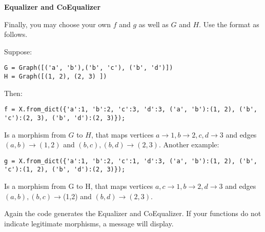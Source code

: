 \documentclass{ximera}
\begin{document}
\textbf{Equalizer and CoEqualizer}

Finally, you may choose your own $f$ and $g$ as well as $G$ and $H$.  Use the format as follows.

Suppose:

\begin{verbatim}
G = Graph([('a', 'b'),('b', 'c'), ('b', 'd')])
H = Graph([(1, 2), (2, 3) ])
\end{verbatim}

Then:

\begin{verbatim}
f = X.from_dict({'a':1, 'b':2, 'c':3, 'd':3, ('a', 'b'):(1, 2), ('b', 'c'):(2, 3), ('b', 'd'):(2, 3)}); 
\end{verbatim}

Is a morphism from $G$ to $H$, that maps vertices $a\to1, b\to2, c,d\to3$ and edges $(a,b)\to(1,2)$ and $(b,c), (b,d)\to(2,3)$.  Another example:

\begin{verbatim}
g = X.from_dict({'a':1, 'b':2, 'c':1, 'd':3, ('a', 'b'):(1, 2), ('b', 'c'):(1, 2), ('b', 'd'):(2, 3)}); 
\end{verbatim}

Is a morphism from G to H, that maps vertices $a, c\to1, b\to2, d\to3$ and edges $(a,b), (b,c)\to$(1,2) and $(b,d)\to(2,3)$.

Again the code generates the Equalizer and CoEqualizer.  If your functions do not indicate legitimate morphisms, a message will display.
\end{document}
